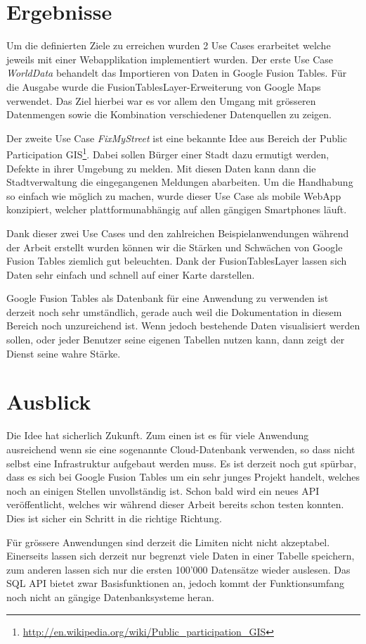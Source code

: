 \section*{Ergebnisse}
Um die definierten Ziele zu erreichen wurden 2 Use Cases erarbeitet welche jeweils mit einer Webapplikation implementiert wurden. Der erste Use Case \emph{WorldData} behandelt das Importieren von Daten in Google Fusion Tables. Für die Ausgabe wurde die FusionTablesLayer-Erweiterung von Google Maps verwendet. Das Ziel hierbei war es vor allem den Umgang mit grösseren Datenmengen sowie  die Kombination verschiedener Datenquellen zu zeigen.

Der zweite Use Case \emph{FixMyStreet} ist eine bekannte Idee aus Bereich der Public Participation \gls{GIS}\footnote{\url{http://en.wikipedia.org/wiki/Public_participation_GIS}}. Dabei sollen Bürger einer Stadt dazu ermutigt werden, Defekte in ihrer Umgebung zu melden. Mit diesen Daten kann dann die Stadtverwaltung die eingegangenen Meldungen abarbeiten. Um die Handhabung so einfach wie möglich zu machen, wurde dieser Use Case als mobile WebApp konzipiert, welcher plattformunabhängig auf allen gängigen Smartphones läuft.

Dank dieser zwei Use Cases und den zahlreichen Beispielanwendungen während der Arbeit erstellt wurden können wir die Stärken und Schwächen von Google Fusion Tables ziemlich gut beleuchten. Dank der FusionTablesLayer lassen sich Daten sehr einfach und schnell auf einer Karte darstellen.

Google Fusion Tables als Datenbank für eine Anwendung zu verwenden ist derzeit noch sehr umständlich, gerade auch weil die Dokumentation in diesem Bereich noch unzureichend ist. Wenn jedoch bestehende Daten visualisiert werden sollen, oder jeder Benutzer seine eigenen Tabellen nutzen kann, dann zeigt der Dienst seine wahre Stärke.

 		
\section*{Ausblick}
Die Idee hat sicherlich Zukunft. Zum einen ist es für viele Anwendung ausreichend wenn sie eine sogenannte \gls{Cloud}-Datenbank verwenden, so dass nicht selbst eine Infrastruktur aufgebaut werden muss. Es ist derzeit noch gut spürbar, dass es sich bei Google Fusion Tables um ein sehr junges Projekt handelt, welches noch an einigen Stellen unvollständig ist. Schon bald wird ein neues API veröffentlicht, welches wir während dieser Arbeit bereits schon testen konnten. Dies ist sicher ein Schritt in die richtige Richtung.

Für grössere Anwendungen sind derzeit die Limiten nicht nicht akzeptabel. Einerseits lassen sich derzeit nur begrenzt viele Daten in einer Tabelle speichern, zum anderen lassen sich nur die ersten 100'000 Datensätze wieder auslesen. Das SQL API bietet zwar Basisfunktionen an, jedoch kommt der Funktionsumfang noch nicht an gängige Datenbanksysteme heran.


